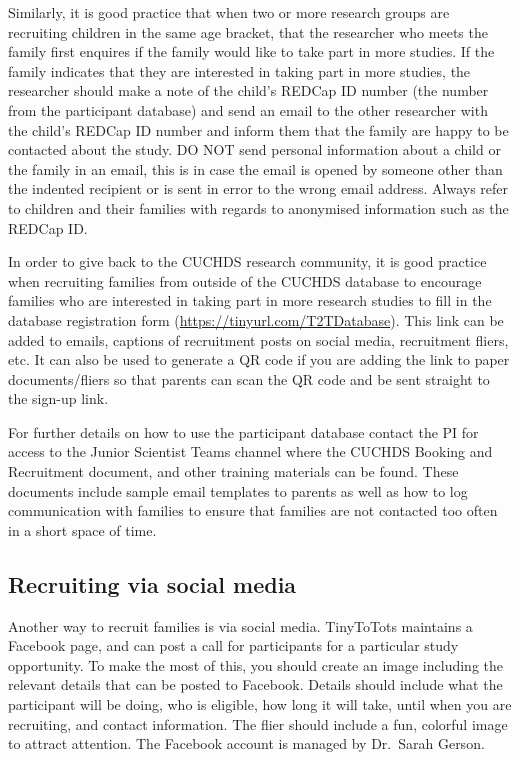 \documentclass[
  12pt,
]{book}
\begin{document}
Similarly, it is good practice that when two or more research groups are recruiting children in the same age bracket, that the researcher who meets the family first enquires if the family would like to take part in more studies. If the family indicates that they are interested in taking part in more studies, the researcher should make a note of the child's REDCap ID number (the number from the participant database) and send an email to the other researcher with the child's REDCap ID number and inform them that the family are happy to be contacted about the study. DO NOT send personal information about a child or the family in an email, this is in case the email is opened by someone other than the indented recipient or is sent in error to the wrong email address. Always refer to children and their families with regards to anonymised information such as the REDCap ID.

In order to give back to the CUCHDS research community, it is good practice when recruiting families from outside of the CUCHDS database to encourage families who are interested in taking part in more research studies to fill in the database registration form (\url{https://tinyurl.com/T2TDatabase}). This link can be added to emails, captions of recruitment posts on social media, recruitment fliers, etc. It can also be used to generate a QR code if you are adding the link to paper documents/fliers so that parents can scan the QR code and be sent straight to the sign-up link.

For further details on how to use the participant database contact the PI for access to the Junior Scientist Teams channel where the CUCHDS Booking and Recruitment document, and other training materials can be found. These documents include sample email templates to parents as well as how to log communication with families to ensure that families are not contacted too often in a short space of time.

\subsection{Recruiting via social media}\label{recruiting-via-social-media}

Another way to recruit families is via social media. TinyToTots maintains a Facebook page, and can post a call for participants for a particular study opportunity. To make the most of this, you should create an image including the relevant details that can be posted to Facebook. Details should include what the participant will be doing, who is eligible, how long it will take, until when you are recruiting, and contact information. The flier should include a fun, colorful image to attract attention. The Facebook account is managed by Dr.~Sarah Gerson.
\end{document}
